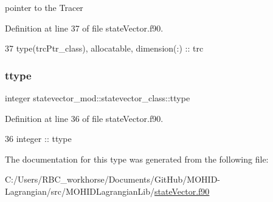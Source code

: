 pointer to the Tracer 



Definition at line 37 of file state\+Vector.\+f90.


\begin{DoxyCode}
37         \textcolor{keywordtype}{type}(trcPtr\_class), \textcolor{keywordtype}{allocatable}, \textcolor{keywordtype}{dimension(:)} :: trc
\end{DoxyCode}
\mbox{\label{structstatevector__mod_1_1statevector__class_a01e7628eb9959749a93b74a5bb21754c}} 
\subsubsection{\texorpdfstring{ttype}{ttype}}
{\footnotesize\ttfamily integer statevector\+\_\+mod\+::statevector\+\_\+class\+::ttype\hspace{0.3cm}{\ttfamily [private]}}



Definition at line 36 of file state\+Vector.\+f90.


\begin{DoxyCode}
36         \textcolor{keywordtype}{integer} :: ttype
\end{DoxyCode}


The documentation for this type was generated from the following file\+:\begin{DoxyCompactItemize}
\item 
C\+:/\+Users/\+R\+B\+C\+\_\+workhorse/\+Documents/\+Git\+Hub/\+M\+O\+H\+I\+D-\/\+Lagrangian/src/\+M\+O\+H\+I\+D\+Lagrangian\+Lib/\mbox{\hyperlink{state_vector_8f90}{state\+Vector.\+f90}}\end{DoxyCompactItemize}
